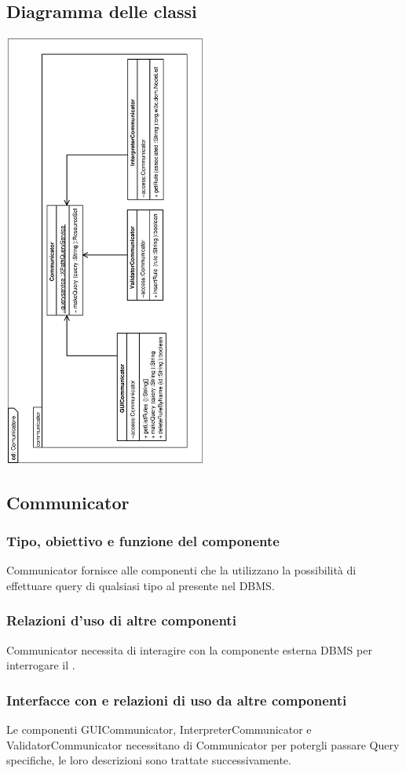 \documentclass[11pt,titlepage,a4paper]{report}
\begin{document}
\subsection{Diagramma delle classi}
\begin{center}
\includegraphics[width=0.5\textwidth, angle=-90]{DiagrammaClassi/Comunicatore.eps}
\end{center}
\subsection{Communicator}
\subsubsection{Tipo, obiettivo e funzione del componente}
Communicator fornisce alle componenti che la utilizzano la possibilit\`a di effettuare query di qualsiasi tipo al \re presente nel DBMS.
\subsubsection{Relazioni d'uso di altre componenti}
Communicator necessita di interagire con la componente esterna DBMS per interrogare il \re.
\subsubsection{Interfacce con e relazioni di uso da altre componenti}
Le componenti GUICommunicator, InterpreterCommunicator e ValidatorCommunicator necessitano di Communicator per potergli passare Query specifiche, le loro descrizioni sono trattate successivamente.
\end{document}
